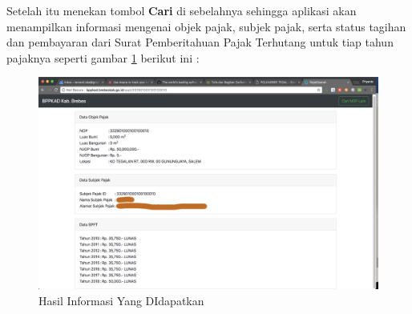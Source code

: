 Setelah itu menekan tombol \textbf{Cari} di sebelahnya sehingga aplikasi akan menampilkan informasi mengenai objek pajak, subjek pajak, serta status tagihan dan pembayaran dari Surat Pemberitahuan Pajak Terhutang untuk tiap tahun pajaknya seperti gambar \ref{fig:result-info} berikut ini :

\begin{figure}[H]
	\centering
	\includegraphics[width=1\textwidth]{./resources/result-info}
	\caption{Hasil Informasi Yang DIdapatkan}
	\label{fig:result-info}
\end{figure}
